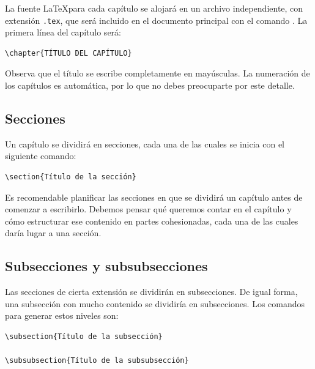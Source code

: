 La fuente \LaTeX para cada capítulo se alojará en un archivo independiente, con extensión \texttt{.tex}, que será incluido en el documento principal con el comando \verb*||. La primera línea del capítulo será:

\begin{verbatim}
\chapter{TÍTULO DEL CAPÍTULO}
\end{verbatim}

Observa que el título se escribe completamente en mayúsculas. La numeración de los capítulos es automática, por lo que no debes preocuparte por este detalle.

\subsection{Secciones}

Un capítulo se dividirá en secciones, cada una de las cuales se inicia con el siguiente comando:

\begin{verbatim}
\section{Título de la sección}
\end{verbatim}

Es recomendable planificar las secciones en que se dividirá un capítulo antes de comenzar a escribirlo. Debemos pensar qué queremos contar en el capítulo y cómo estructurar ese contenido en partes cohesionadas, cada una de las cuales daría lugar a una sección.

\subsection{Subsecciones y subsubsecciones}

Las secciones de cierta extensión se dividirán en subsecciones. De igual forma, una subsección con mucho contenido se dividiría en subsecciones. Los comandos para generar estos niveles son:

\begin{verbatim}
\subsection{Título de la subsección}

\subsubsection{Título de la subsubsección}
\end{verbatim}

